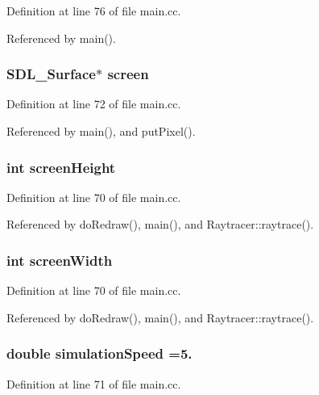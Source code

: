 Definition at line 76 of file main.\+cc.



Referenced by main().

\subsubsection[{screen}]{\setlength{\rightskip}{0pt plus 5cm}S\+D\+L\+\_\+\+Surface$\ast$ screen}\label{main_8cc_a78fa3957d73de49cb81d047857504218}


Definition at line 72 of file main.\+cc.



Referenced by main(), and put\+Pixel().

\subsubsection[{screen\+Height}]{\setlength{\rightskip}{0pt plus 5cm}int screen\+Height}\label{main_8cc_a9ebc1dbd77788c4bfa27758a6725413f}


Definition at line 70 of file main.\+cc.



Referenced by do\+Redraw(), main(), and Raytracer\+::raytrace().

\subsubsection[{screen\+Width}]{\setlength{\rightskip}{0pt plus 5cm}int screen\+Width}\label{main_8cc_ae50cb92a78d9e0a4f4bd718fc02bd294}


Definition at line 70 of file main.\+cc.



Referenced by do\+Redraw(), main(), and Raytracer\+::raytrace().

\subsubsection[{simulation\+Speed}]{\setlength{\rightskip}{0pt plus 5cm}double simulation\+Speed =5.}\label{main_8cc_a82d884a25b7f323bb18ab91363a0e8e4}


Definition at line 71 of file main.\+cc.

